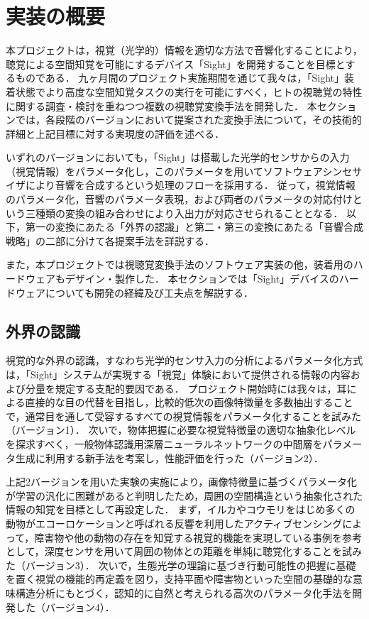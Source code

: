 \section{実装の概要}

本プロジェクトは，視覚（光学的）情報を適切な方法で音響化することにより，聴覚による空間知覚を可能にするデバイス「Sight」を開発することを目標とするものである．
九ヶ月間のプロジェクト実施期間を通じて我々は，「Sight」装着状態でより高度な空間知覚タスクの実行を可能にすべく，ヒトの視聴覚の特性に関する調査・検討を重ねつつ複数の視聴覚変換手法を開発した．
本セクションでは，各段階のバージョンにおいて提案された変換手法について，その技術的詳細と上記目標に対する実現度の評価を述べる．

いずれのバージョンにおいても，「Sight」は搭載した光学的センサからの入力（視覚情報）をパラメータ化し，このパラメータを用いてソフトウェアシンセサイザにより音響を合成するという処理のフローを採用する．
従って，視覚情報のパラメータ化，音響のパラメータ表現，および両者のパラメータの対応付けという三種類の変換の組み合わせにより入出力が対応させられることとなる．
以下，第一の変換にあたる「外界の認識」と第二・第三の変換にあたる「音響合成戦略」の二部に分けて各提案手法を詳説する．

また，本プロジェクトでは視聴覚変換手法のソフトウェア実装の他，装着用のハードウェアもデザイン・製作した．
本セクションでは「Sight」デバイスのハードウェアについても開発の経緯及び工夫点を解説する．


\subsection{外界の認識}

視覚的な外界の認識，すなわち光学的センサ入力の分析によるパラメータ化方式は，「Sight」システムが実現する「視覚」体験において提供される情報の内容および分量を規定する支配的要因である．
プロジェクト開始時には我々は，耳による直接的な目の代替を目指し，比較的低次の画像特徴量を多数抽出することで，通常目を通して受容するすべての視覚情報をパラメータ化することを試みた（バージョン1）．
次いで，物体把握に必要な視覚特徴量の適切な抽象化レベルを探求すべく，一般物体認識用深層ニューラルネットワークの中間層をパラメータ生成に利用する新手法を考案し，性能評価を行った（バージョン2）．

上記2バージョンを用いた実験の実施により，画像特徴量に基づくパラメータ化が学習の汎化に困難があると判明したため，周囲の空間構造という抽象化された情報の知覚を目標として再設定した．
まず，イルカやコウモリをはじめ多くの動物がエコーロケーションと呼ばれる反響を利用したアクティブセンシングによって，障害物や他の動物の存在を知覚する視覚的機能を実現している事例を参考として，深度センサを用いて周囲の物体との距離を単純に聴覚化することを試みた（バージョン3）．
次いで，生態光学の理論に基づき行動可能性の把握に基礎を置く視覚の機能的再定義を図り，支持平面や障害物といった空間の基礎的な意味構造分析にもとづく，認知的に自然と考えられる高次のパラメータ化手法を開発した（バージョン4）．

